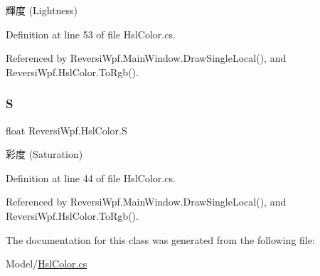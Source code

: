 輝度 (Lightness) 



Definition at line 53 of file Hsl\+Color.\+cs.



Referenced by Reversi\+Wpf.\+Main\+Window.\+Draw\+Single\+Local(), and Reversi\+Wpf.\+Hsl\+Color.\+To\+Rgb().

\mbox{\label{class_reversi_wpf_1_1_hsl_color_a3304ba59ade02e6ad5ced23120e72bdc}} 
\subsubsection{\texorpdfstring{S}{S}}
{\footnotesize\ttfamily float Reversi\+Wpf.\+Hsl\+Color.\+S\hspace{0.3cm}{\ttfamily [get]}}



彩度 (Saturation) 



Definition at line 44 of file Hsl\+Color.\+cs.



Referenced by Reversi\+Wpf.\+Main\+Window.\+Draw\+Single\+Local(), and Reversi\+Wpf.\+Hsl\+Color.\+To\+Rgb().



The documentation for this class was generated from the following file\+:\begin{DoxyCompactItemize}
\item 
Model/\hyperlink{_hsl_color_8cs}{Hsl\+Color.\+cs}\end{DoxyCompactItemize}
